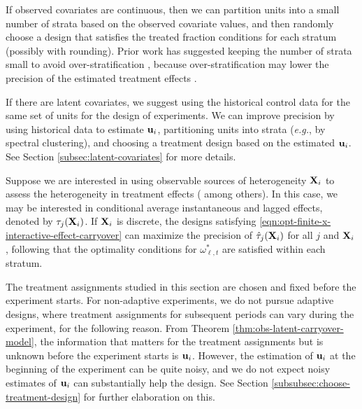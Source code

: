 	
	
	
	{\blue If observed covariates are continuous, then we can partition units into a small number of strata based on the observed covariate values, and then randomly choose a design that satisfies the treated fraction conditions for each stratum (possibly with rounding). Prior work has suggested keeping the number of strata small to avoid over-stratification \citep{kernan1999stratified}, because over-stratification may lower the precision of the estimated treatment effects \citep{de2008consequences}.  }
	
	
	{\blue If there are latent covariates, we suggest using the historical control data for the same set of units for the design of experiments. We can improve precision by using historical data to estimate $\mathbf{u}_i$, partitioning units into strata ({\it e.g.}, by spectral clustering), and choosing a treatment design based on the estimated $\mathbf{u}_i$. See Section \ref{subsec:latent-covariates} for more details. }
	
	
	\begin{remark}\label{remark:cate}
	Suppose we are interested in using observable sources of heterogeneity $\mathbf{X}_i$ to assess the heterogeneity in treatment effects (\cite{robinson1988root,wager2018estimation} among others). In this case, we may be interested in conditional average instantaneous and lagged effects, denoted by $\tau_j(\mathbf{X}_i)$. If $\mathbf{X}_i$ is discrete, the designs satisfying \eqref{eqn:opt-finite-x-interactive-effect-carryover} can maximize the precision of $\hat{\tau}_j(\mathbf{X}_i)$ for all $j$ and $\mathbf{X}_i$, following that the optimality conditions for $\omega_{\ell,t}^\ast$ are satisfied within each stratum.
    
	\end{remark}
	

	

    
    {\blue \begin{remark}\label{rem:fixed-sample-adaptive-design}
	The treatment assignments studied in this section are chosen and fixed before the experiment starts. For non-adaptive experiments, we do not pursue adaptive designs, where treatment assignments for subsequent periods can vary during the experiment, for the following reason. From Theorem \ref{thm:obs-latent-carryover-model}, the information that matters for the treatment assignments but is unknown before the experiment starts is $\mathbf{u}_i$. However, the estimation of $\mathbf{u}_i$ at the beginning of the experiment can be quite noisy, and we do not expect noisy estimates of $\mathbf{u}_i$ can substantially help the design. See Section \ref{subsubsec:choose-treatment-design} for further elaboration on this.
\end{remark}}